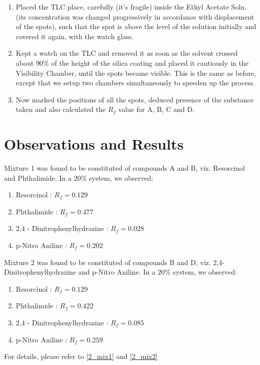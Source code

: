 \begin{enumerate}
		\item Placed the TLC place, carefully (it's fragile) inside the Ethyl Acetate Soln. (its concentration was changed progressively in accordance with displacement of the spots), such that the spot is above the level of the solution initially and covered it again, with the watch glass. 
		\item Kept a watch on the TLC and removed it as soon as the solvent crossed about $90\%$ of the height of the silica coating and placed it cautiously in the Visibility Chamber, until the spots became visible. This is the same as before, except that we setup two chambers simultaneously to speeden up the process.
		\item Now marked the positions of all the spots, deduced presence of the substance taken and also calculated the $R_f$ value for A, B, C and D.
	\end{enumerate}
\section{Observations and Results}
	Mixture 1 was found to be constituted of compounds A and B, viz. Resorcinol and Phthalimide. In a $20\%$ system, we observed:
	\begin{enumerate}
		\item Resorcinol : $R_f=0.129$
		\item Phthalimide : $R_f=0.477$
		\item 2,4 - Dinitrophenylhydrazine : $R_f=0.028$
		\item p-Nitro Aniline : $R_f=0.202$
	\end{enumerate}

	Mixture 2 was found to be constituted of compounds B and D, viz. 2,4-Dinitrophenylhydrazine and p-Nitro Aniline. In a $20\%$ system, we observed:
	\begin{enumerate}
		\item Resorcinol : $R_f=0.129$
		\item Phthalimide : $R_f=0.422$
		\item 2,4 - Dinitrophenylhydrazine : $R_f=0.085$
		\item p-Nitro Aniline : $R_f=0.259$
	\end{enumerate}
	
	For details, please refer to \autoref{2_mix1} and \autoref{2_mix2}


